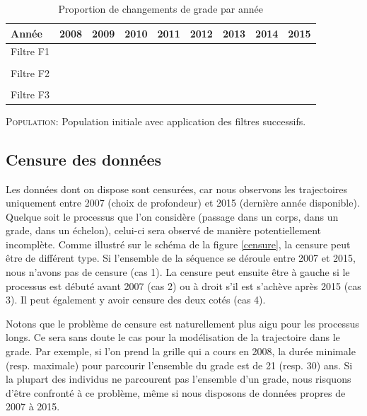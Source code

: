 \documentclass[11pt,a4paper]{article}
\begin{document}
\begin{table}[h!]
\centering
\caption{Proportion de changements de grade par année} 
\label{quality2}
\begin{tabular}{lcccccccc}
\toprule
Année & 2008 & 2009 & 2010 & 2011 & 2012 & 2013 & 2014 & 2015 \\[0.2em]
\midrule
Filtre F1 &&&&&& \\ \midrule
 
&&&&&& \\ 
Filtre F2 &&&&&& \\ \midrule
   
&&&&&& \\
Filtre F3 &&&&&& \\ \midrule
   
\bottomrule
\end{tabular}
\begin{minipage}{12cm}
\footnotesize
\textsc{Population:} Population initiale avec application des filtres successifs.
\end{minipage}
\end{table}




\subsection{Censure des données}

Les données dont on dispose sont censurées, car nous observons les trajectoires uniquement entre 2007 (choix de profondeur) et 2015 (dernière année disponible). Quelque soit le processus que l'on considère (passage dans un corps, dans un grade, dans un échelon), celui-ci sera observé de manière potentiellement incomplète. Comme illustré sur le schéma de la figure  \ref{censure}, la censure peut être de différent type. Si l'ensemble de la séquence se déroule entre 2007 et 2015, nous n'avons pas de censure (cas 1). La censure peut ensuite être à gauche si le processus est débuté avant 2007 (cas 2) ou à droit s'il est s'achève après 2015 (cas 3). Il peut également y avoir censure des deux cotés (cas 4). 

Notons que le problème de censure est naturellement plus aigu pour les processus longs. Ce sera sans doute le cas pour la modélisation de la trajectoire dans le grade. Par exemple, si l'on prend la grille qui a cours en 2008, la durée minimale (resp. maximale) pour parcourir l'ensemble du grade est de 21 (resp. 30) ans. Si la plupart des individus ne parcourent pas l'ensemble d'un grade, nous risquons d'être confronté à ce problème, même si nous disposons de données propres de 2007 à 2015. 
\end{document}
